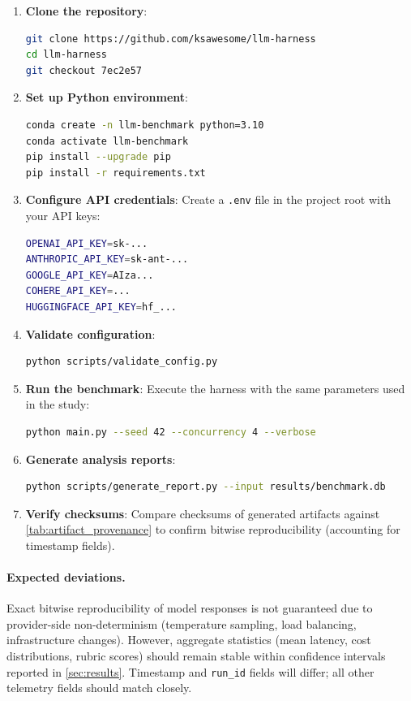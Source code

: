 \begin{enumerate}
\item \textbf{Clone the repository}:
\begin{lstlisting}[language=bash,style=mystyle]
git clone https://github.com/ksawesome/llm-harness
cd llm-harness
git checkout 7ec2e57
\end{lstlisting}

\item \textbf{Set up Python environment}:
\begin{lstlisting}[language=bash,style=mystyle]
conda create -n llm-benchmark python=3.10
conda activate llm-benchmark
pip install --upgrade pip
pip install -r requirements.txt
\end{lstlisting}

\item \textbf{Configure API credentials}: Create a \texttt{.env} file in the project root with your API keys:
\begin{lstlisting}[language=bash,style=mystyle]
OPENAI_API_KEY=sk-...
ANTHROPIC_API_KEY=sk-ant-...
GOOGLE_API_KEY=AIza...
COHERE_API_KEY=...
HUGGINGFACE_API_KEY=hf_...
\end{lstlisting}

\item \textbf{Validate configuration}:
\begin{lstlisting}[language=bash,style=mystyle]
python scripts/validate_config.py
\end{lstlisting}

\item \textbf{Run the benchmark}: Execute the harness with the same parameters used in the study:
\begin{lstlisting}[language=bash,style=mystyle]
python main.py --seed 42 --concurrency 4 --verbose
\end{lstlisting}

\item \textbf{Generate analysis reports}:
\begin{lstlisting}[language=bash,style=mystyle]
python scripts/generate_report.py --input results/benchmark.db
\end{lstlisting}

\item \textbf{Verify checksums}: Compare checksums of generated artifacts against \cref{tab:artifact_provenance} to confirm bitwise reproducibility (accounting for timestamp fields).
\end{enumerate}

\paragraph{Expected deviations.} Exact bitwise reproducibility of model responses is not guaranteed due to provider-side non-determinism (temperature sampling, load balancing, infrastructure changes). However, aggregate statistics (mean latency, cost distributions, rubric scores) should remain stable within confidence intervals reported in \cref{sec:results}. Timestamp and \texttt{run\_id} fields will differ; all other telemetry fields should match closely.
